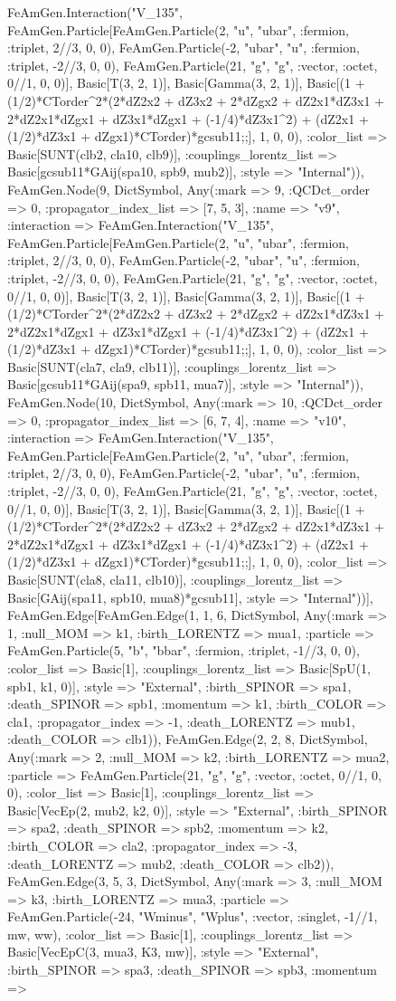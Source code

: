 \documentclass{revtex4}
\begin{document}
\begin{figure}[!htb]
\begin{center}
{FeAmGen.Interaction("V_135", FeAmGen.Particle[FeAmGen.Particle(2, "u", "ubar", :fermion, :triplet, 2//3, 0, 0), FeAmGen.Particle(-2, "ubar", "u", :fermion, :triplet, -2//3, 0, 0), FeAmGen.Particle(21, "g", "g", :vector, :octet, 0//1, 0, 0)], Basic[T(3, 2, 1)], Basic[Gamma(3, 2, 1)], Basic[(1 + (1/2)*CTorder^2*(2*dZ2x2 + dZ3x2 + 2*dZgx2 + dZ2x1*dZ3x1 + 2*dZ2x1*dZgx1 + dZ3x1*dZgx1 + (-1/4)*dZ3x1^2) + (dZ2x1 + (1/2)*dZ3x1 + dZgx1)*CTorder)*gcsub11;;], 1, 0, 0), :color_list => Basic[SUNT(clb2, cla10, clb9)], :couplings_lorentz_list => Basic[gcsub11*GAij(spa10, spb9, mub2)], :style => "Internal")), FeAmGen.Node(9, Dict{Symbol, Any}(:mark => 9, :QCDct_order => 0, :propagator_index_list => [7, 5, 3], :name => "v9", :interaction => FeAmGen.Interaction("V_135", FeAmGen.Particle[FeAmGen.Particle(2, "u", "ubar", :fermion, :triplet, 2//3, 0, 0), FeAmGen.Particle(-2, "ubar", "u", :fermion, :triplet, -2//3, 0, 0), FeAmGen.Particle(21, "g", "g", :vector, :octet, 0//1, 0, 0)], Basic[T(3, 2, 1)], Basic[Gamma(3, 2, 1)], Basic[(1 + (1/2)*CTorder^2*(2*dZ2x2 + dZ3x2 + 2*dZgx2 + dZ2x1*dZ3x1 + 2*dZ2x1*dZgx1 + dZ3x1*dZgx1 + (-1/4)*dZ3x1^2) + (dZ2x1 + (1/2)*dZ3x1 + dZgx1)*CTorder)*gcsub11;;], 1, 0, 0), :color_list => Basic[SUNT(cla7, cla9, clb11)], :couplings_lorentz_list => Basic[gcsub11*GAij(spa9, spb11, mua7)], :style => "Internal")), FeAmGen.Node(10, Dict{Symbol, Any}(:mark => 10, :QCDct_order => 0, :propagator_index_list => [6, 7, 4], :name => "v10", :interaction => FeAmGen.Interaction("V_135", FeAmGen.Particle[FeAmGen.Particle(2, "u", "ubar", :fermion, :triplet, 2//3, 0, 0), FeAmGen.Particle(-2, "ubar", "u", :fermion, :triplet, -2//3, 0, 0), FeAmGen.Particle(21, "g", "g", :vector, :octet, 0//1, 0, 0)], Basic[T(3, 2, 1)], Basic[Gamma(3, 2, 1)], Basic[(1 + (1/2)*CTorder^2*(2*dZ2x2 + dZ3x2 + 2*dZgx2 + dZ2x1*dZ3x1 + 2*dZ2x1*dZgx1 + dZ3x1*dZgx1 + (-1/4)*dZ3x1^2) + (dZ2x1 + (1/2)*dZ3x1 + dZgx1)*CTorder)*gcsub11;;], 1, 0, 0), :color_list => Basic[SUNT(cla8, cla11, clb10)], :couplings_lorentz_list => Basic[GAij(spa11, spb10, mua8)*gcsub11], :style => "Internal"))], FeAmGen.Edge[FeAmGen.Edge(1, 1, 6, Dict{Symbol, Any}(:mark => 1, :null_MOM => k1, :birth_LORENTZ => mua1, :particle => FeAmGen.Particle(5, "b", "bbar", :fermion, :triplet, -1//3, 0, 0), :color_list => Basic[1], :couplings_lorentz_list => Basic[SpU(1, spb1, k1, 0)], :style => "External", :birth_SPINOR => spa1, :death_SPINOR => spb1, :momentum => k1, :birth_COLOR => cla1, :propagator_index => -1, :death_LORENTZ => mub1, :death_COLOR => clb1)), FeAmGen.Edge(2, 2, 8, Dict{Symbol, Any}(:mark => 2, :null_MOM => k2, :birth_LORENTZ => mua2, :particle => FeAmGen.Particle(21, "g", "g", :vector, :octet, 0//1, 0, 0), :color_list => Basic[1], :couplings_lorentz_list => Basic[VecEp(2, mub2, k2, 0)], :style => "External", :birth_SPINOR => spa2, :death_SPINOR => spb2, :momentum => k2, :birth_COLOR => cla2, :propagator_index => -3, :death_LORENTZ => mub2, :death_COLOR => clb2)), FeAmGen.Edge(3, 5, 3, Dict{Symbol, Any}(:mark => 3, :null_MOM => k3, :birth_LORENTZ => mua3, :particle => FeAmGen.Particle(-24, "Wminus", "Wplus", :vector, :singlet, -1//1, mw, ww), :color_list => Basic[1], :couplings_lorentz_list => Basic[VecEpC(3, mua3, K3, mw)], :style => "External", :birth_SPINOR => spa3, :death_SPINOR => spb3, :momentum => }
\end{center}
\end{figure}
\end{document}
